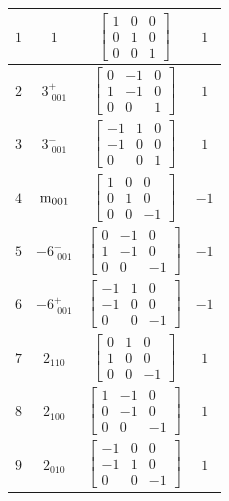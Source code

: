 \documentclass[fleqn,8pt]{jsarticle}
\begin{document}
\begin{longtable}{cccc}
$ 1 $ & $ 1 $ & $ \begin{bmatrix} 1 & 0 & 0 \\ 0 & 1 & 0 \\ 0 & 0 & 1 \end{bmatrix} $ & $ 1 $ \\ \hline
$ 2 $ & $ 3^{+}_{\,\,001} $ & $ \begin{bmatrix} 0 & -1 & 0 \\ 1 & -1 & 0 \\ 0 & 0 & 1 \end{bmatrix} $ & $ 1 $ \\ \hline
$ 3 $ & $ 3^{-}_{\,\,001} $ & $ \begin{bmatrix} -1 & 1 & 0 \\ -1 & 0 & 0 \\ 0 & 0 & 1 \end{bmatrix} $ & $ 1 $ \\ \hline
$ 4 $ & $ {\rm m}_{001} $ & $ \begin{bmatrix} 1 & 0 & 0 \\ 0 & 1 & 0 \\ 0 & 0 & -1 \end{bmatrix} $ & $ -1 $ \\ \hline
$ 5 $ & $ -6^{-}_{\,\,001} $ & $ \begin{bmatrix} 0 & -1 & 0 \\ 1 & -1 & 0 \\ 0 & 0 & -1 \end{bmatrix} $ & $ -1 $ \\ \hline
$ 6 $ & $ -6^{+}_{\,\,001} $ & $ \begin{bmatrix} -1 & 1 & 0 \\ -1 & 0 & 0 \\ 0 & 0 & -1 \end{bmatrix} $ & $ -1 $ \\ \hline
$ 7 $ & $ 2{}_{110} $ & $ \begin{bmatrix} 0 & 1 & 0 \\ 1 & 0 & 0 \\ 0 & 0 & -1 \end{bmatrix} $ & $ 1 $ \\ \hline
$ 8 $ & $ 2{}_{100} $ & $ \begin{bmatrix} 1 & -1 & 0 \\ 0 & -1 & 0 \\ 0 & 0 & -1 \end{bmatrix} $ & $ 1 $ \\ \hline
$ 9 $ & $ 2{}_{010} $ & $ \begin{bmatrix} -1 & 0 & 0 \\ -1 & 1 & 0 \\ 0 & 0 & -1 \end{bmatrix} $ & $ 1 $ \\ \hline

\end{longtable}
\end{document}
